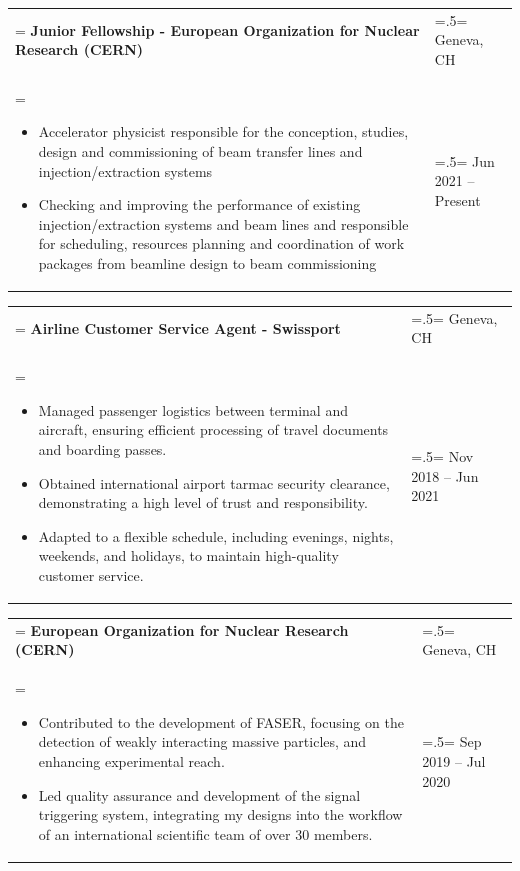 \documentclass[letterpaper, 11pt]{article}
\begin{document}
\begin{tabularx}{1.0\textwidth} { 
   >{\raggedright\arraybackslash\hsize=1.5\hsize\linewidth=\hsize}X 
   >{\raggedleft\arraybackslash\hsize=.5\hsize\linewidth=\hsize}X }
\normalsize
\bf{Junior Fellowship - European Organization for Nuclear Research (CERN)} & Geneva, CH\\
\normalfont \begin{itemize}[leftmargin=*,noitemsep,topsep=0pt]
\item Accelerator physicist responsible for the conception, studies, design and commissioning of beam transfer lines and injection/extraction systems
\item Checking and improving the performance of existing injection/extraction systems and beam lines and responsible for scheduling, resources planning and coordination of work packages from beamline design to beam commissioning
\end{itemize} & Jun 2021 -- Present
\end{tabularx}

\begin{tabularx}{1.0\textwidth} { 
   >{\raggedright\arraybackslash\hsize=1.5\hsize\linewidth=\hsize}X 
   >{\raggedleft\arraybackslash\hsize=.5\hsize\linewidth=\hsize}X }
\normalsize
\bf{Airline Customer Service Agent - Swissport} & Geneva, CH\\
\normalfont \begin{itemize}[leftmargin=*,noitemsep,topsep=0pt]
\item Managed passenger logistics between terminal and aircraft, ensuring efficient processing of travel documents and boarding passes.
\item Obtained international airport tarmac security clearance, demonstrating a high level of trust and responsibility.
\item Adapted to a flexible schedule, including evenings, nights, weekends, and holidays, to maintain high-quality customer service.
\end{itemize} & Nov 2018 -- Jun 2021
\end{tabularx}

\begin{tabularx}{1.0\textwidth} { 
   >{\raggedright\arraybackslash\hsize=1.5\hsize\linewidth=\hsize}X 
   >{\raggedleft\arraybackslash\hsize=.5\hsize\linewidth=\hsize}X }
\normalsize
\bf{European Organization for Nuclear Research (CERN)} & Geneva, CH\\
\normalfont \begin{itemize}[leftmargin=*,noitemsep,topsep=0pt]
\item Contributed to the development of FASER, focusing on the detection of weakly interacting massive particles, and enhancing experimental reach.
\item Led quality assurance and development of the signal triggering system, integrating my designs into the workflow of an international scientific team of over 30 members.
\end{itemize} & Sep 2019 -- Jul 2020
\end{tabularx}
\end{document}
